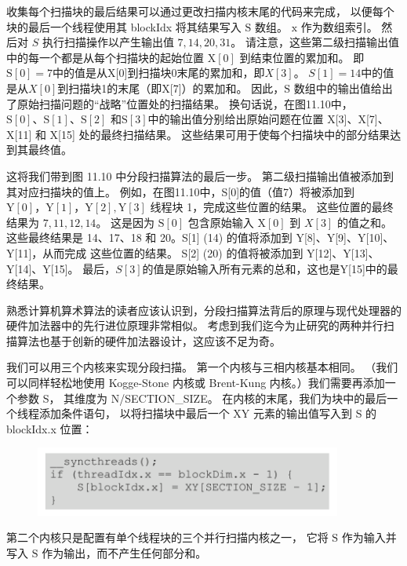 收集每个扫描块的最后结果可以通过更改扫描内核末尾的代码来完成，
以便每个块的最后一个线程使用其 blockIdx 将其结果写入 $\mathrm{S}$ 数组。 $\mathrm{x}$ 作为数组索引。 
然后对 $S$ 执行扫描操作以产生输出值 $7,14,20,31$。 
请注意，这些第二级扫描输出值中的每一个都是从每个扫描块的起始位置 $\mathrm{X}[0]$ 到结束位置的累加和。 
即$\mathrm{S}[0]=7$中的值是从X[0]到扫描块0末尾的累加和，即$X[3]$。 
$S[1]=14$中的值是从$X[0]$到扫描块1的末尾（即X[7]）的累加和。 
因此，$\mathrm{S}$ 数组中的输出值给出了原始扫描问题的“战略”位置处的扫描结果。 
换句话说，在图11.10中，$\mathrm{S}[0]、\mathrm{S}[1]、\mathrm{S}[2]$
和$\mathrm{S}[3]$中的输出值分别给出原始问题在位置 X[3]、X[7]、X[11] 和 X[15] 处的最终扫描结果。 
这些结果可用于使每个扫描块中的部分结果达到其最终值。

这将我们带到图 11.10 中分段扫描算法的最后一步。 第二级扫描输出值被添加到其对应扫描块的值上。 
例如，在图11.10中，S[0]的值（值7）将被添加到$\mathrm{Y}[0]，\mathrm{Y}[1]，\mathrm{Y}[2], \mathrm{Y}[3]$ 线程块 1，完成这些位置的结果。 这些位置的最终结果为 $7,11,12,14$。 
这是因为 $\mathrm{S}[0]$ 包含原始输入 $\mathrm{X}[0]$ 到 $X[3]$ 的值之和。 
这些最终结果是 14、17、18 和 20。S[1] (14) 的值将添加到 Y[8]、Y[9]、Y[10]、Y[11]，从而完成 这些位置的结果。 
S[2] (20) 的值将被添加到 Y[12]、Y[13]、Y[14]、Y[15]。 最后，$S[3]$的值是原始输入所有元素的总和，这也是Y[15]中的最终结果。

熟悉计算机算术算法的读者应该认识到，分段扫描算法背后的原理与现代处理器的硬件加法器中的先行进位原理非常相似。 
考虑到我们迄今为止研究的两种并行扫描算法也基于创新的硬件加法器设计，这应该不足为奇。

我们可以用三个内核来实现分段扫描。 第一个内核与三相内核基本相同。 
（我们可以同样轻松地使用 Kogge-Stone 内核或 Brent-Kung 内核。）我们需要再添加一个参数 S，
其维度为 N/SECTION\_SIZE。 
在内核的末尾，我们为块中的最后一个线程添加条件语句，
以将扫描块中最后一个 $\mathrm{XY}$ 元素的输出值写入到 S 的 blockIdx.x 位置：

\begin{figure}[H]
	\centering
	\includegraphics[width=0.9\textwidth]{figs/F11-a5.png}
\end{figure}

第二个内核只是配置有单个线程块的三个并行扫描内核之一，
它将 $\mathrm{S}$ 作为输入并写入 $\mathrm{S}$ 作为输出，而不产生任何部分和。


